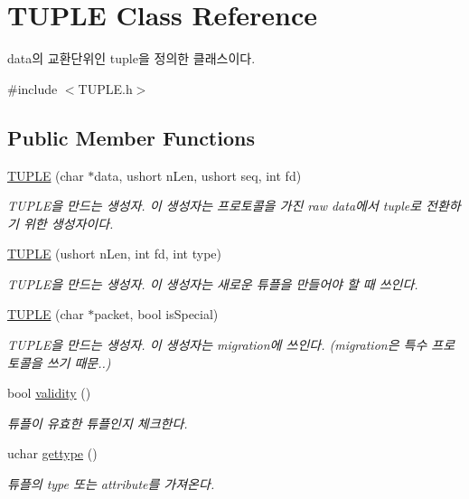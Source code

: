 \hypertarget{classTUPLE}{}\section{T\+U\+P\+L\+E Class Reference}
\label{classTUPLE}


data의 교환단위인 tuple을 정의한 클래스이다.  




{\ttfamily \#include $<$T\+U\+P\+L\+E.\+h$>$}

\subsection*{Public Member Functions}
\begin{DoxyCompactItemize}
\item 
\hyperlink{classTUPLE_aed245ec6fb2cd8e94cd9bc1e7eb4a86d}{T\+U\+P\+L\+E} (char $\ast$data, ushort n\+Len, ushort seq, int fd)
\begin{DoxyCompactList}\small\item\em T\+U\+P\+L\+E을 만드는 생성자. 이 생성자는 프로토콜을 가진 raw data에서 tuple로 전환하기 위한 생성자이다. \end{DoxyCompactList}\item 
\hyperlink{classTUPLE_a00b079f9d403adb63356880c62d48e22}{T\+U\+P\+L\+E} (ushort n\+Len, int fd, int type)
\begin{DoxyCompactList}\small\item\em T\+U\+P\+L\+E을 만드는 생성자. 이 생성자는 새로운 튜플을 만들어야 할 때 쓰인다. \end{DoxyCompactList}\item 
\hyperlink{classTUPLE_ac92a492d3f8a793fe02fe364244c34af}{T\+U\+P\+L\+E} (char $\ast$packet, bool is\+Special)
\begin{DoxyCompactList}\small\item\em T\+U\+P\+L\+E을 만드는 생성자. 이 생성자는 migration에 쓰인다. (migration은 특수 프로토콜을 쓰기 때문..) \end{DoxyCompactList}\item 
bool \hyperlink{classTUPLE_a15e6fe7915b00b6fce4842630dc3bbb0}{validity} ()
\begin{DoxyCompactList}\small\item\em 튜플이 유효한 튜플인지 체크한다. \end{DoxyCompactList}\item 
uchar \hyperlink{classTUPLE_a6616af9acaa70eadc0d4110a6b81a642}{gettype} ()
\begin{DoxyCompactList}\small\item\em 튜플의 type 또는 attribute를 가져온다. \end{DoxyCompactList}\item 

\end{DoxyCompactItemize}
